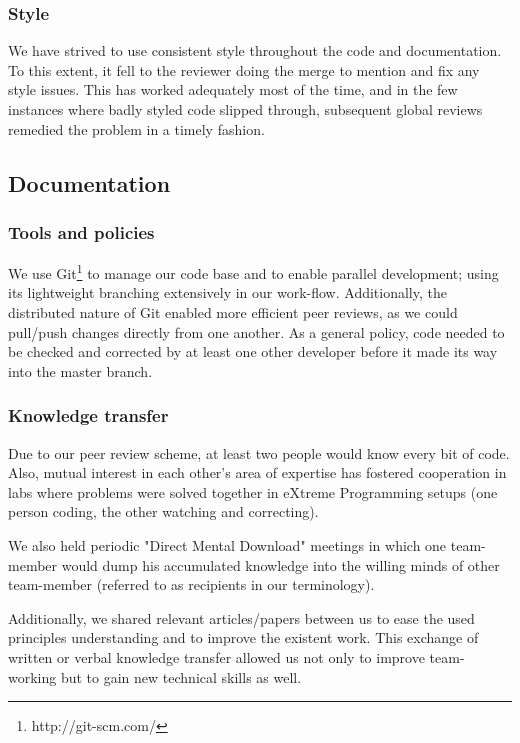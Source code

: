 \documentclass[a4paper,11pt,titlepage]{article}
\begin{document}
\subsubsection{Style}
We have strived to use consistent style throughout the code and
documentation. To this extent, it fell to the reviewer doing the
merge to mention and fix any style issues. This has worked adequately
most of the time, and in the few instances where badly styled code
slipped through, subsequent global reviews remedied the problem in a
timely fashion.


\subsection{Documentation}

\subsubsection{Tools and policies}
We use Git\footnote{http://git-scm.com/} to manage our code base and
to enable parallel development; using its lightweight branching
extensively in our work-flow. Additionally, the distributed nature
of Git enabled more efficient peer reviews, as we could pull/push
changes directly from one another. As a general policy, code needed
to be checked and corrected by at least one other developer before it
made its way into the master branch.

\subsubsection{Knowledge transfer}
Due to our peer review scheme, at least two people would know every
bit of code. Also, mutual interest in each other's area of expertise
has fostered cooperation in labs where problems were solved together
in eXtreme Programming setups (one person coding, the other watching
and correcting).

We also held periodic "Direct Mental Download" meetings in which one
team-member would dump his accumulated knowledge into the willing
minds of other team-member (referred to as recipients in our terminology).

Additionally, we shared relevant articles/papers between us to ease
the used principles understanding and to improve the existent work.
This exchange of written or verbal knowledge transfer allowed us not
only to improve team-working but to gain new technical skills as well.
\end{document}
